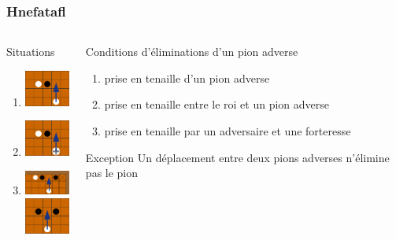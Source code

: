 \documentclass[11pt]{beamer}
\begin{document}
\begin{frame}

\frametitle{Hnefatafl}
\subtitle{Hnefatafl}
\begin{columns}[t]
\begin{column}{3cm}
	\begin{block}{Situations}
	\begin{enumerate}
		\item \centering \includegraphics[width=50pt]{images/cap1.png}
		\item \centering \includegraphics[width=50pt]{images/cap2.png}
		\item  \centering \includegraphics[width=50pt]{images/cap3.png}
		\\
		 \centering \includegraphics[width=50pt]{images/cap4.png}
	\end{enumerate}	
	\end{block} 
\end{column}

\begin{column}{7cm}
	\begin{block}{Conditions d'éliminations d'un pion adverse}
		\begin{enumerate}
		\item prise en tenaille d'un pion adverse
		\item prise en tenaille entre le roi et un pion adverse
		\item prise en tenaille par un adversaire et une forteresse 
		\end{enumerate}
	\end{block}  
	
	\begin{alertblock}{Exception}
Un déplacement entre deux pions adverses n'élimine pas le pion
	\end{alertblock}  
\end{column}
\end{columns}  
\end{frame}
\end{document}
